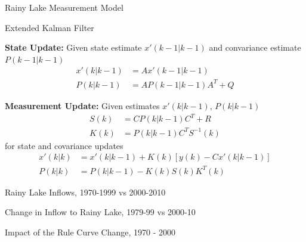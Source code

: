 \documentclass[compress,english]{beamer}
\begin{document}
{{{{{{\begin{frame}{Rainy Lake Measurement Model}
\end{frame}

\begin{frame}{Extended Kalman Filter}

{\bf State Update:} Given state estimate $x'(k-1|k-1)$ and convariance estimate $P(k-1|k-1)$
\begin{align*}
x'(k|k-1) & = A x'(k-1|k-1) \\
P(k|k-1) & = A P(k-1|k-1) A^T + Q
\end{align*}

{\bf Measurement Update:} Given estimates $x'(k|k-1)$, $P(k|k-1)$
\begin{align*}
S(k) & = CP(k|k-1)C^T + R \\
K(k) & = P(k|k-1)C^TS^{-1}(k)
\end{align*}
for state and covariance updates
\begin{align*}
x'(k|k) & = x'(k|k-1) + K(k)\left[y(k) - C x'(k|k-1)\right] \\
P(k|k) & = P(k|k-1) - K(k)S(k)K^T(k)
\end{align*}
\end{frame}

\begin{frame}{Rainy Lake Inflows, 1970-1999 vs 2000-2010}

\begin{center}
\end{center}

\end{frame}

\begin{frame}{Change in Inflow to Rainy Lake, 1979-99 vs 2000-10}

\begin{center}
\end{center}

\end{frame}

\begin{frame}{Impact of the Rule Curve Change, 1970 - 2000}


\end{frame}}}}}}}
\end{document}
